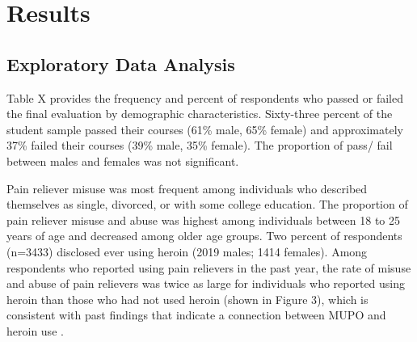 \documentclass[sigconf]{acmart}
\begin{document}
 
\section{Results}

\subsection{Exploratory Data Analysis}

Table X provides the frequency and percent of respondents who passed or
failed the final evaluation by demographic characteristics. Sixty-three percent 
of the student sample passed their courses (61\% male, 65\% female) and 
approximately 37\% failed their courses (39\% male, 35\% female). The 
proportion of pass/ fail between males and females was not significant. 


Pain reliever misuse was most frequent among individuals who described 
themselves as single, divorced, or with some college education. The 
proportion of pain reliever misuse and abuse was highest among individuals 
between 18 to 25 years of age and decreased among older age groups. Two 
percent of respondents (n=3433) disclosed ever using heroin (2019 males; 
1414 females). Among respondents who reported using pain relievers in the 
past year, the rate of misuse and abuse of pain relievers was twice as 
large for individuals who reported using heroin than those who had not 
used heroin (shown in Figure 3), which is consistent with past findings 
that indicate a connection between MUPO and heroin use 
\cite{muhuri13, unick13}.

\end{document}
